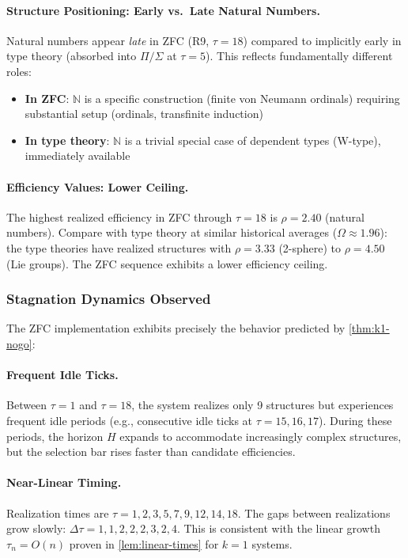 \documentclass[11pt]{article}
\theoremstyle{definition}
\theoremstyle{remark}
\begin{document}
\paragraph{Structure Positioning: Early vs.\ Late Natural Numbers.}
Natural numbers appear \emph{late} in ZFC (R9, $\tau=18$) compared to implicitly early in type theory (absorbed into $\Pi/\Sigma$ at $\tau=5$). This reflects fundamentally different roles:
\begin{itemize}
\item \textbf{In ZFC}: $\mathbb{N}$ is a specific construction (finite von Neumann ordinals) requiring substantial setup (ordinals, transfinite induction)
\item \textbf{In type theory}: $\mathbb{N}$ is a trivial special case of dependent types (W-type), immediately available
\end{itemize}

\paragraph{Efficiency Values: Lower Ceiling.}
The highest realized efficiency in ZFC through $\tau=18$ is $\rho = 2.40$ (natural numbers). Compare with type theory at similar historical averages ($\Omega \approx 1.96$): the type theories have realized structures with $\rho = 3.33$ (2-sphere) to $\rho = 4.50$ (Lie groups). The ZFC sequence exhibits a lower efficiency ceiling.

\subsubsection{Stagnation Dynamics Observed}

The ZFC implementation exhibits precisely the behavior predicted by \cref{thm:k1-nogo}:

\paragraph{Frequent Idle Ticks.}
Between $\tau = 1$ and $\tau = 18$, the system realizes only 9 structures but experiences frequent idle periods (e.g., consecutive idle ticks at $\tau = 15, 16, 17$). During these periods, the horizon $H$ expands to accommodate increasingly complex structures, but the selection bar rises faster than candidate efficiencies.

\paragraph{Near-Linear Timing.}
Realization times are $\tau = 1, 2, 3, 5, 7, 9, 12, 14, 18$. The gaps between realizations grow slowly: $\Delta\tau = 1, 1, 2, 2, 2, 3, 2, 4$. This is consistent with the linear growth $\tau_n = O(n)$ proven in \cref{lem:linear-times} for $k=1$ systems.
\end{document}
